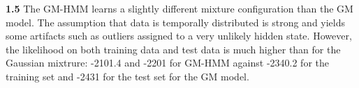 \documentclass[11pt, oneside]{amsart}   	%
\begin{document}
 \textbf{1.5} The GM-HMM learns a slightly different mixture configuration than the GM model. The assumption that data is temporally distributed is strong and yields some artifacts such as outliers assigned to a very unlikely hidden state. However, the likelihood on both training data and test data is much higher than for the Gaussian mixtrure:  -2101.4 and -2201 for GM-HMM against -2340.2 for the training set and -2431 for the test set for the GM model.
 
 
\end{document}
